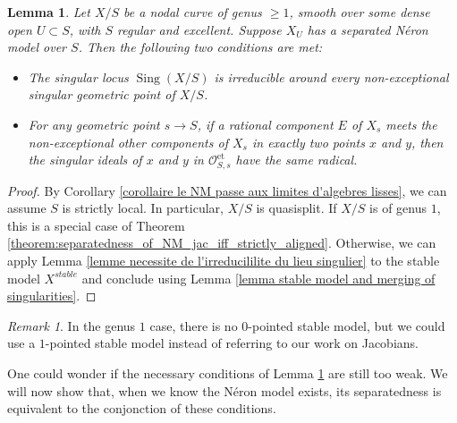 \documentclass[a4paper,12pt]{amsart} %
\numberwithin{equation}{subsection}
\newcommand{\on}[1]{\operatorname{#1}}
\def\Sing{\operatorname{Sing}}
\theoremstyle{definition}
\theoremstyle{plain}%
\newtheorem{lemma}[definition]{Lemma}
\theoremstyle{remark}
\newtheorem{remark}[definition]{Remark}
\renewcommand{\O}{\mathcal{O}}
\begin{document}
\begin{lemma}\label{lemma:necessary_condition_neron_models_curves}
Let $X/S$ be a nodal curve of genus $\geq 1$, smooth over some dense open $U\subset S$, with $S$ regular and excellent. Suppose $X_U$ has a separated N\'eron model over $S$. Then the following two conditions are met:
\begin{itemize}
\item The singular locus $\Sing(X/S)$ is irreducible around every non-exceptional singular geometric point of $X/S$.
\item For any geometric point $s\to S$, if a rational component $E$ of $X_s$ meets the non-exceptional other components of $X_s$ in exactly two points $x$ and $y$, then the singular ideals of $x$ and $y$ in $\O_{S,s}^{\on{et}}$ have the same radical.
\end{itemize}
\end{lemma}

\begin{proof}
By Corollary \ref{corollaire le NM passe aux limites d'algebres lisses}, we can assume $S$ is strictly local. In particular, $X/S$ is quasisplit. If $X/S$ is of genus $1$, this is a special case of Theorem \ref{theorem:separatedness_of_NM_jac_iff_strictly_aligned}. Otherwise, we can apply Lemma \ref{lemme necessite de l'irreducililite du lieu singulier} to the stable model $X^{stable}$ and conclude using Lemma \ref{lemma stable model and merging of singularities}.
\end{proof}

\begin{remark}
In the genus $1$ case, there is no $0$-pointed stable model, but we could use a $1$-pointed stable model instead of referring to our work on Jacobians.
\end{remark}

One could wonder if the necessary conditions of Lemma \ref{lemma:necessary_condition_neron_models_curves} are still too weak. We will now show that, when we know the N\'eron model exists, its separatedness is equivalent to the conjonction of these conditions.
\end{document}
